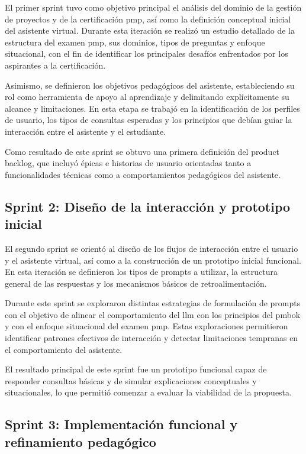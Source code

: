 El primer sprint tuvo como objetivo principal el análisis del dominio de la gestión de proyectos y de la certificación \gls{pmp}, así como la definición conceptual inicial del asistente virtual. Durante esta iteración se realizó un estudio detallado de la estructura del examen \gls{pmp}, sus dominios, tipos de preguntas y enfoque situacional, con el fin de identificar los principales desafíos enfrentados por los aspirantes a la certificación.

Asimismo, se definieron los objetivos pedagógicos del asistente, estableciendo su rol como herramienta de apoyo al aprendizaje y delimitando explícitamente su alcance y limitaciones. En esta etapa se trabajó en la identificación de los perfiles de usuario, los tipos de consultas esperadas y los principios que debían guiar la interacción entre el asistente y el estudiante.

Como resultado de este sprint se obtuvo una primera definición del product backlog, que incluyó épicas e historias de usuario orientadas tanto a funcionalidades técnicas como a comportamientos pedagógicos del asistente.

\subsection{Sprint 2: Diseño de la interacción y prototipo inicial}

El segundo sprint se orientó al diseño de los flujos de interacción entre el usuario y el asistente virtual, así como a la construcción de un prototipo inicial funcional. En esta iteración se definieron los tipos de prompts a utilizar, la estructura general de las respuestas y los mecanismos básicos de retroalimentación.

Durante este sprint se exploraron distintas estrategias de formulación de prompts con el objetivo de alinear el comportamiento del \gls{llm} con los principios del \gls{pmbok} y con el enfoque situacional del examen \gls{pmp}. Estas exploraciones permitieron identificar patrones efectivos de interacción y detectar limitaciones tempranas en el comportamiento del asistente.

El resultado principal de este sprint fue un prototipo funcional capaz de responder consultas básicas y de simular explicaciones conceptuales y situacionales, lo que permitió comenzar a evaluar la viabilidad de la propuesta.

\subsection{Sprint 3: Implementación funcional y refinamiento pedagógico}

